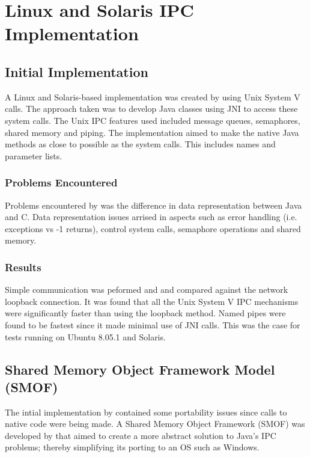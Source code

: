 \documentclass[12pt,a4paper,oneside]{article}
\begin{document}
\section{Linux and Solaris IPC Implementation}
  \subsection{Initial Implementation}
    A Linux and Solaris-based
    implementation was created by \cite{WellsIPCMultiProc} using Unix
    System V calls. The approach taken was to develop Java classes using JNI
    to access these system calls. The Unix IPC features used included
    message queues, semaphores, shared memory and piping. The
    implementation aimed to make the native Java methods as close to
    possible as the system calls. This includes names and parameter lists.

  \subsubsection{Problems Encountered}
    Problems encountered by \cite{WellsIPCMultiProc} was the
    difference in data representation between Java and C. Data representation
    issues arrised in aspects such as error handling (i.e. exceptions vs -1
    returns), control system calls, semaphore operations and shared memory.

  \subsubsection{Results}
    Simple communication was peformed and and
    compared against the network loopback connection. It was found that all
    the Unix System V IPC mechanisms were significantly faster than using the
    loopback method. Named pipes were found to be fastest since it made
    minimal use of JNI calls. This was the case for tests running on Ubuntu
    8.05.1 and Solaris.

  \subsection{Shared Memory Object Framework Model (SMOF)}
    The intial implementation by \cite{WellsIPCMultiProc} contained some
    portability issues since calls to native code were being made. A
    Shared Memory Object Framework (SMOF) was developed by \cite{WellsEfficientIPCJava} that aimed to create a more abstract solution to Java's IPC problems; thereby simplifying its porting to an OS such as Windows.
\end{document}
